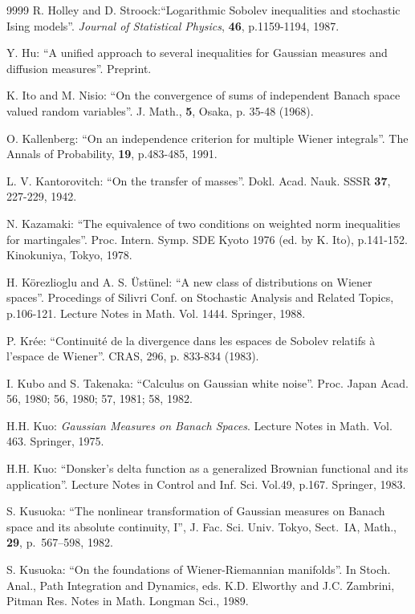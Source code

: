 \documentclass[12pt,a4paper]{book}
\begin{document}
\begin{thebibliography}{9999}
R. Holley and D. Stroock:``Logarithmic Sobolev inequalities and
stochastic Ising models''. {\sl Journal of Statistical Physics}, {\bf
  46}, p.1159-1194, 1987.




Y. Hu: ``A unified approach to several inequalities for Gaussian
measures and diffusion measures''. Preprint.



K. Ito and M. Nisio: ``On the convergence of sums of
  independent Banach space valued random variables''. J. Math., {\bf 5},
  Osaka, p. 35-48 (1968).

O. Kallenberg: ``On an independence criterion for multiple
  Wiener integrals''. The Annals of Probability, {\bf 19}, p.483-485, 1991.

L. V. Kantorovitch: ``On the transfer of
masses''. Dokl. Acad. Nauk. SSSR {\bf 37}, 227-229, 1942.


N. Kazamaki: ``The equivalence of two conditions on
weighted norm inequalities for martingales''. Proc. Intern. Symp.
SDE Kyoto 1976 (ed. by K. Ito), p.141-152. Kinokuniya, Tokyo,
1978.




H. K\"orezlioglu and A. S. \"Ust\"unel: ``A new class of
distributions on Wiener spaces''.  Procedings of Silivri Conf. on Stochastic
Analysis and Related Topics, p.106-121. Lecture Notes in Math. Vol. 1444.
Springer, 1988.


P. Kr\'ee: ``Continuit\'e de la divergence dans les espaces
de Sobolev relatifs \`a l'espace de Wiener''. CRAS, 296, p. 833-834
(1983).

I. Kubo and S. Takenaka: ``Calculus on Gaussian white
  noise''. Proc. Japan Acad. 56, 1980; 56, 1980; 57, 1981; 58, 1982.

H.H. Kuo: {\sl  Gaussian Measures on Banach Spaces}. Lecture
  Notes in Math. Vol. 463. Springer, 1975.

H.H. Kuo: ``Donsker's delta function as a generalized
  Brownian functional and its application''. Lecture Notes in Control
  and Inf. Sci. Vol.49, p.167.  Springer, 1983.


S. Kusuoka:
``The nonlinear transformation of Gaussian measures on Banach space and
its absolute continuity, I'',
J. Fac. Sci. Univ. Tokyo, Sect.~IA, Math., {\bf 29}, p.~567--598, 1982.

S. Kusuoka:
``On the foundations of Wiener-Riemannian manifolds''. In
Stoch. Anal., Path Integration and Dynamics, eds. K.D. Elworthy and
J.C. Zambrini, Pitman Res. Notes in Math. Longman Sci., 1989.


\end{thebibliography}
\end{document}
